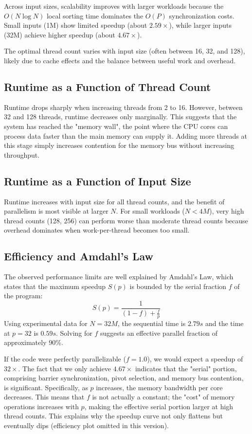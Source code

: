 \documentclass[11pt]{article}
\begin{document}
Across input sizes, scalability improves with larger workloads because the $O(N \log N)$ local sorting time dominates the $O(P)$ synchronization costs. Small inputs (1M) show limited speedup (about $2.59\times$), while larger inputs (32M) achieve higher speedup (about $4.67\times$).

The optimal thread count varies with input size (often between 16, 32, and 128), likely due to cache effects and the balance between useful work and overhead.

\subsection{Runtime as a Function of Thread Count}

Runtime drops sharply when increasing threads from 2 to 16. However, between 32 and 128 threads, runtime decreases only marginally. This suggests that the system has reached the "memory wall", the point where the CPU cores can process data faster than the main memory can supply it. Adding more threads at this stage simply increases contention for the memory bus without increasing throughput.

\subsection{Runtime as a Function of Input Size}

Runtime increases with input size for all thread counts, and the benefit of parallelism is most visible at larger $N$. For small workloads ($N < 4M$), very high thread counts (128, 256) can perform worse than moderate thread counts because overhead dominates when work-per-thread becomes too small.

\subsection{Efficiency and Amdahl's Law}

The observed performance limits are well explained by Amdahl’s Law, which states that the maximum speedup $S(p)$ is bounded by the serial fraction $f$ of the program:
\[
S(p) = \frac{1}{(1 - f) + \frac{f}{p}}
\]
Using experimental data for $N=32M$, the sequential time is $2.79s$ and the time at $p=32$ is $0.59s$. Solving for $f$ suggests an effective parallel fraction of approximately 90\%.

If the code were perfectly parallelizable ($f=1.0$), we would expect a speedup of $32\times$. The fact that we only achieve $4.67\times$ indicates that the "serial" portion, comprising barrier synchronization, pivot selection, and memory bus contention, is significant. Specifically, as $p$ increases, the memory bandwidth per core decreases. This means that $f$ is not actually a constant; the "cost" of memory operations increases with $p$, making the effective serial portion larger at high thread counts. This explains why the speedup curve not only flattens but eventually dips (efficiency plot omitted in this version).
\end{document}
